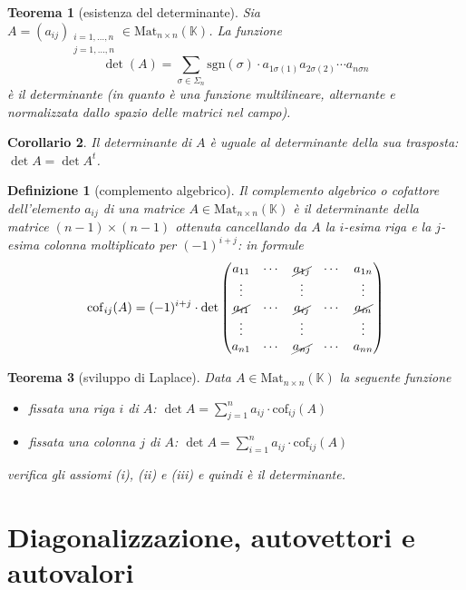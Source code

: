 \documentclass[9pt, a4paper]{article}
\newcommand{\K}{\mathbb{K}}
\newcommand{\sgn}{\mathrm{sgn}}
\newcommand{\cof}{\mathrm{cof}}
\theoremstyle{mythm}
\newtheorem{definition}{Definizione}[section]
\newtheorem{thm}{Teorema}[section]
\newtheorem{corollary}[thm]{Corollario}
\begin{document}
\begin{thm}[esistenza del determinante]
	Sia $ A = (a_{ij})_{\substack{i = 1, \ldots, n \\ j = 1, \ldots, n}} \in \mathrm{Mat}_{n \times n} (\K) $. La funzione \[\det(A) = \sum_{\sigma \in \Sigma_n} \sgn(\sigma) \cdot a_{1 \sigma(1)} a_{2 \sigma(2)} \cdots a_{n \sigma{n}}\] è il determinante (in quanto è una funzione multilineare, alternante e normalizzata dallo spazio delle matrici nel campo). 
\end{thm}

\begin{corollary}
	Il determinante di $ A $ è uguale al determinante della sua trasposta: $ \det A = \det A^{t} $. 
\end{corollary}

\begin{definition}[complemento algebrico]
	Il complemento algebrico o cofattore dell'elemento $ a_{ij} $ di una matrice $ A \in \mathrm{Mat}_{n \times n} (\K) $ è il determinante della matrice $ (n - 1) \times (n - 1) $ ottenuta cancellando da $ A $ la $ i $-esima riga e la $ j $-esima colonna moltiplicato per $ (-1)^{i + j} $: in formule
	\[\cof_{ij}(A) = (-1)^{i + j} \cdot \det 
	\begin{pmatrix}
		a_{11} & \cdots & \cancel{a_{1j}} & \cdots & a_{1n} \\
		\vdots &        & \vdots &        & \vdots \\
		\cancel{a_{i1}} & \cdots & \cancel{a_{ij}} & \cdots & \cancel{a_{in}} \\
		\vdots &  		& \vdots &  	  & \vdots \\
		a_{n1} & \cdots & \cancel{a_{nj}} & \cdots & a_{nn} \\
	\end{pmatrix}\]
\end{definition}

\begin{thm}[sviluppo di Laplace]
	Data $ A \in \mathrm{Mat}_{n \times n} (\K) $ la seguente funzione
	\begin{itemize}
		\item fissata una riga $ i $ di $ A $: $ \det A = \sum_{j = 1}^{n} a_{ij} \cdot \cof_{ij} (A) $
		\item fissata una colonna $ j $ di $ A $: $ \det A = \sum_{i = 1}^{n} a_{ij} \cdot \cof_{ij} (A) $
	\end{itemize}
	verifica gli assiomi (i), (ii) e (iii) e quindi è il determinante. 
\end{thm}

\clearpage

\section{Diagonalizzazione, autovettori e autovalori}
\end{document}
